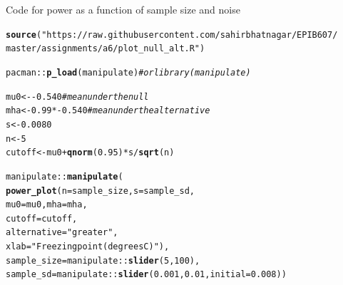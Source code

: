 \documentclass[handout]{beamer}\usepackage[]{graphicx}\usepackage[]{color}
\newcommand{\hlnum}[1]{\textcolor[rgb]{0.686,0.059,0.569}{#1}}%
\newcommand{\hlstr}[1]{\textcolor[rgb]{0.192,0.494,0.8}{#1}}%
\newcommand{\hlcom}[1]{\textcolor[rgb]{0.678,0.584,0.686}{\textit{#1}}}%
\newcommand{\hlopt}[1]{\textcolor[rgb]{0,0,0}{#1}}%
\newcommand{\hlstd}[1]{\textcolor[rgb]{0.345,0.345,0.345}{#1}}%
\newcommand{\hlkwb}[1]{\textcolor[rgb]{0.69,0.353,0.396}{#1}}%
\newcommand{\hlkwc}[1]{\textcolor[rgb]{0.333,0.667,0.333}{#1}}%
\newcommand{\hlkwd}[1]{\textcolor[rgb]{0.737,0.353,0.396}{\textbf{#1}}}%
\newenvironment{knitrout}{}{} %
\begin{document}
\begin{frame}[fragile]{Code for power as a function of sample size and noise}
\begin{knitrout}\scriptsize
{}\color{fgcolor}
\begin{alltt}
\hlkwd{source}\hlstd{(}\hlstr{"https://raw.githubusercontent.com/sahirbhatnagar/EPIB607/
master/assignments/a6/plot_null_alt.R"}\hlstd{)}

\hlstd{pacman}\hlopt{::}\hlkwd{p_load}\hlstd{(manipulate)} \hlcom{# or library(manipulate)}

\hlstd{mu0} \hlkwb{<-} \hlopt{-}\hlnum{0.540} \hlcom{# mean under the null}
\hlstd{mha} \hlkwb{<-} \hlnum{0.99}\hlopt{*-}\hlnum{0.540} \hlcom{# mean under the alternative}
\hlstd{s} \hlkwb{<-} \hlnum{0.0080}
\hlstd{n} \hlkwb{<-} \hlnum{5}
\hlstd{cutoff} \hlkwb{<-} \hlstd{mu0} \hlopt{+} \hlkwd{qnorm}\hlstd{(}\hlnum{0.95}\hlstd{)} \hlopt{*} \hlstd{s} \hlopt{/} \hlkwd{sqrt}\hlstd{(n)}

\hlstd{manipulate}\hlopt{::}\hlkwd{manipulate}\hlstd{(}
\hlkwd{power_plot}\hlstd{(}\hlkwc{n} \hlstd{= sample_size,} \hlkwc{s} \hlstd{= sample_sd,}
        \hlkwc{mu0} \hlstd{= mu0,} \hlkwc{mha} \hlstd{= mha,}
        \hlkwc{cutoff} \hlstd{= cutoff,}
        \hlkwc{alternative} \hlstd{=} \hlstr{"greater"}\hlstd{,}
        \hlkwc{xlab} \hlstd{=} \hlstr{"Freezing point (degrees C)"}\hlstd{),}
        \hlkwc{sample_size} \hlstd{= manipulate}\hlopt{::}\hlkwd{slider}\hlstd{(}\hlnum{5}\hlstd{,} \hlnum{100}\hlstd{),}
        \hlkwc{sample_sd} \hlstd{= manipulate}\hlopt{::}\hlkwd{slider}\hlstd{(}\hlnum{0.001}\hlstd{,} \hlnum{0.01}\hlstd{,} \hlkwc{initial} \hlstd{=} \hlnum{0.008}\hlstd{))}
\end{alltt}

\end{knitrout}
\end{frame}
\end{document}
